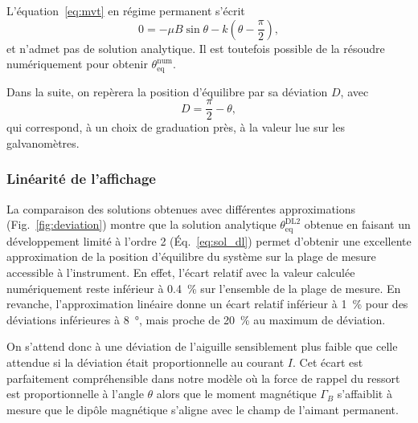 \documentclass[12pt,a4paper,fleqn]{article}
\begin{document}
L'équation~\ref{eq:mvt} en régime permanent s'écrit
\begin{equation}
    0 = -\mu B \sin \theta - k\left(\theta-\frac{\pi}{2}\right),
    \label{eq:sol_num}
\end{equation}
et n'admet pas de solution analytique.
Il est toutefois possible de la résoudre numériquement pour obtenir $\theta_\mathrm{eq}^\mathrm{num}$.

Dans la suite, on repèrera la position d'équilibre par sa déviation $D$, avec
\begin{equation}
    D = \frac{\pi}{2} - \theta,
\end{equation}
qui correspond, à un choix de graduation près, à la valeur lue sur les galvanomètres.


\subsubsection{Linéarité de l'affichage}

La comparaison des solutions obtenues avec différentes approximations (Fig.~\ref{fig:deviation}) montre que la solution analytique $\theta_\mathrm{eq}^\mathrm{DL2}$ obtenue en faisant un développement limité à l'ordre 2 (Éq.~\ref{eq:sol_dl}) permet d'obtenir une excellente approximation de la position d'équilibre du système sur la plage de mesure accessible à l'instrument.
En effet, l'écart relatif avec la valeur calculée numériquement reste inférieur à \SI{0.4}{\percent} sur l'ensemble de la plage de mesure.
En revanche, l'approximation linéaire donne un écart relatif inférieur à \SI{1}{\%} pour des déviations inférieures à \SI{8}{\degree}, mais proche de \SI{20}{\%} au maximum de déviation.

On s'attend donc à une déviation de l'aiguille sensiblement plus faible que celle attendue si la déviation était proportionnelle au courant $I$.
Cet écart est parfaitement compréhensible dans notre modèle où la force de rappel du ressort est proportionnelle à l'angle $\theta$ alors que le moment magnétique $\Gamma_B$ s'affaiblit à mesure que le dipôle magnétique s'aligne avec le champ de l'aimant permanent.
\end{document}
